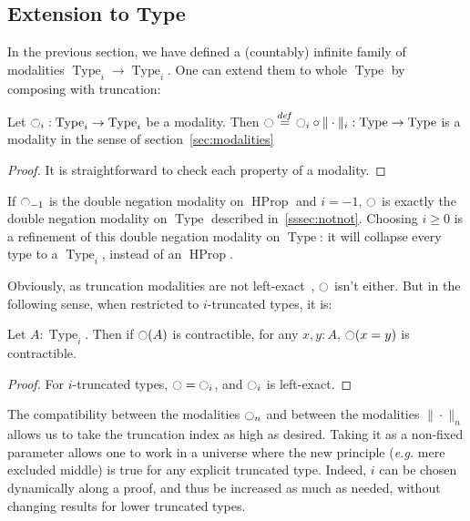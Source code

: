 \documentclass[notfinal]{jfrarticle}
\DeclareMathOperator{\Type}{Type}
\DeclareMathOperator{\HProp}{HProp}
\newcommand \defeq {\overset{de\hspace{-0.2ex}f}{=}}
\newcommand{\modal}{\ensuremath{\ocircle}}
\begin{document}


\subsection{Extension to Type}
\label{ssec:extension-type}

In the previous section, we have defined a (countably) infinite family of
modalities $\Type_i \to \Type_i$. One can extend them to whole
$\Type$ by composing with truncation:

\begin{lem}\label{lem:type}
  Let $\modal_i:\Type_i \to \Type_i$ be a modality. Then $\modal
  \defeq \modal_i
  \circ \|\cdot\|_i : \Type \to \Type$ is a modality in the sense
  of section~\ref{sec:modalities}
\end{lem}
\begin{proof}
  It is straightforward to check each property of a modality.
\end{proof}
If $\modal_{-1}$ is the double negation modality on $\HProp$ and
$i=-1$, $\modal$ is exactly the double negation modality on $\Type$
described in~\ref{sssec:notnot}.
Choosing $i\geqslant 0$ is a refinement of this double negation
modality on $\Type$: it will collapse every type to a $\Type_i$,
instead of an $\HProp$.

Obviously, as truncation modalities are not left-exact~\cite[Exercise
7.11]{hottbook}, $\modal$ isn't either. But in the following sense, when
restricted to $i$-truncated types, it is:
\begin{lem}
  Let $A:\Type_i$. Then if $\modal(A)$ is contractible, for any $x,y:A$,
  $\modal(x=y)$ is contractible.
\end{lem}
\begin{proof}
  For $i$-truncated types, $\modal = \modal_i$, and $\modal_i$ is left-exact.
\end{proof}

The compatibility between the modalities $\modal_n$ and between the
modalities $\|\cdot \|_n$ allows us to take the truncation index as
high as desired.
Taking it as a non-fixed parameter allows one to work in a
universe where the new principle ({\em e.g.} mere excluded middle) is
true for any explicit truncated type. Indeed, $i$ can be chosen
dynamically along a proof, and thus be increased as much as needed,
without changing results for lower truncated types.
\end{document}
